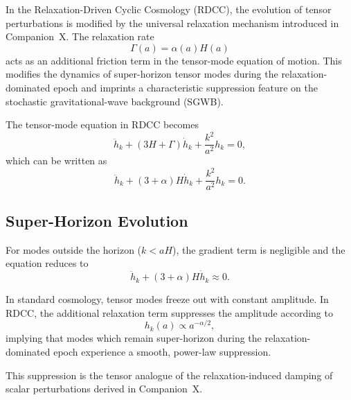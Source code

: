 \documentclass[11pt,a4paper]{article}
\begin{document}
In the Relaxation-Driven Cyclic Cosmology (RDCC), the evolution of tensor perturbations is
modified by the universal relaxation mechanism introduced in Companion~X. The relaxation
rate
\begin{equation}
\Gamma(a) = \alpha(a) H(a)
\end{equation}
acts as an additional friction term in the tensor-mode equation of motion. This modifies the
dynamics of super-horizon tensor modes during the relaxation-dominated epoch and imprints a
characteristic suppression feature on the stochastic gravitational-wave background (SGWB).

The tensor-mode equation in RDCC becomes
\begin{equation}
\ddot{h}_{k} + \left( 3H + \Gamma \right) \dot{h}_{k} + \frac{k^{2}}{a^{2}} h_{k} = 0,
\end{equation}
which can be written as
\begin{equation}
\ddot{h}_{k} + (3 + \alpha)H \dot{h}_{k} + \frac{k^{2}}{a^{2}} h_{k} = 0.
\end{equation}


\subsection{Super-Horizon Evolution}

For modes outside the horizon (\(k < aH\)), the gradient term is negligible and the equation
reduces to
\begin{equation}
\ddot{h}_{k} + (3 + \alpha)H \dot{h}_{k} \approx 0.
\end{equation}

In standard cosmology, tensor modes freeze out with constant amplitude. In RDCC, the
additional relaxation term suppresses the amplitude according to
\begin{equation}
h_{k}(a) \propto a^{-\alpha/2},
\end{equation}
implying that modes which remain super-horizon during the relaxation-dominated epoch
experience a smooth, power-law suppression.

This suppression is the tensor analogue of the relaxation-induced damping of scalar
perturbations derived in Companion~X.

\end{document}

